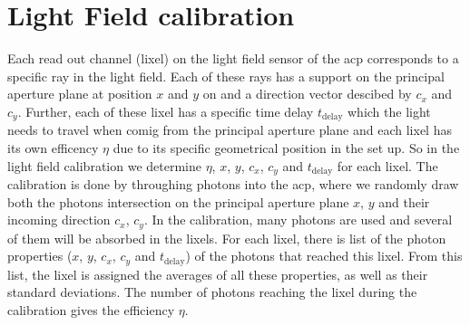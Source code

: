 \section{Light Field calibration}
%
Each read out channel (lixel) on the light field sensor of the \ac{acp} corresponds to a specific ray in the light field. 
%
Each of these rays has a support on the principal aperture plane at position $x$ and $y$ on and a direction vector descibed by $c_x$ and $c_y$.
%
Further, each of these lixel has a specific time delay $t_\text{delay}$ which the light needs to travel when comig from the principal aperture plane and each lixel has its own efficency $\eta$ due to its specific geometrical position in the set up.
%
So in the light field calibration we determine $\eta$, $x$, $y$, $c_x$, $c_y$ and $t_\text{delay}$ for each lixel.
%
The calibration is done by throughing photons into the \ac{acp}, where we randomly draw both the photons intersection on the principal aperture plane $x$, $y$ and their incoming direction $c_x$, $c_y$.
%
In the calibration, many photons are used and several of them will be absorbed in the lixels.
%
For each lixel, there is list of the photon properties ($x$, $y$, $c_x$, $c_y$ and $t_\text{delay}$) of the photons that reached this lixel.
%
From this list, the lixel is assigned the averages of all these properties, as well as their standard deviations.
%
The number of photons reaching the lixel during the calibration gives the efficiency $\eta$.
%
